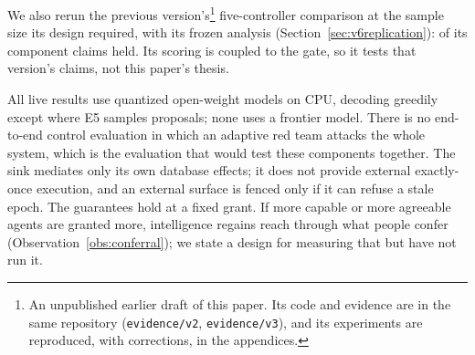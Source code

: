 We also rerun the previous version's\footnote{An unpublished earlier draft of this paper. Its code and evidence are in
the same repository (\texttt{evidence/v2}, \texttt{evidence/v3}), and its experiments are reproduced, with corrections,
in the appendices.} five-controller comparison at the sample size its design required, with its frozen analysis
(Section~\ref{sec:v6replication}): \vsixEOneHeld{} of its component claims held. Its scoring is coupled to the gate, so
it tests that version's claims, not this paper's thesis.

 All live results use quantized open-weight models on CPU, decoding greedily except where E5 samples
proposals; none uses a frontier model. There is no end-to-end control evaluation in which an adaptive red team attacks the whole
system, which is the evaluation that would test these components together. The sink mediates only its own database effects; it does not provide external exactly-once
execution, and an external surface is fenced only if it can refuse a stale epoch. The guarantees hold at a fixed grant.
If more capable or more agreeable agents are granted more, intelligence regains reach through what people
confer (Observation~\ref{obs:conferral}); we state a design for measuring that but have not run it.
